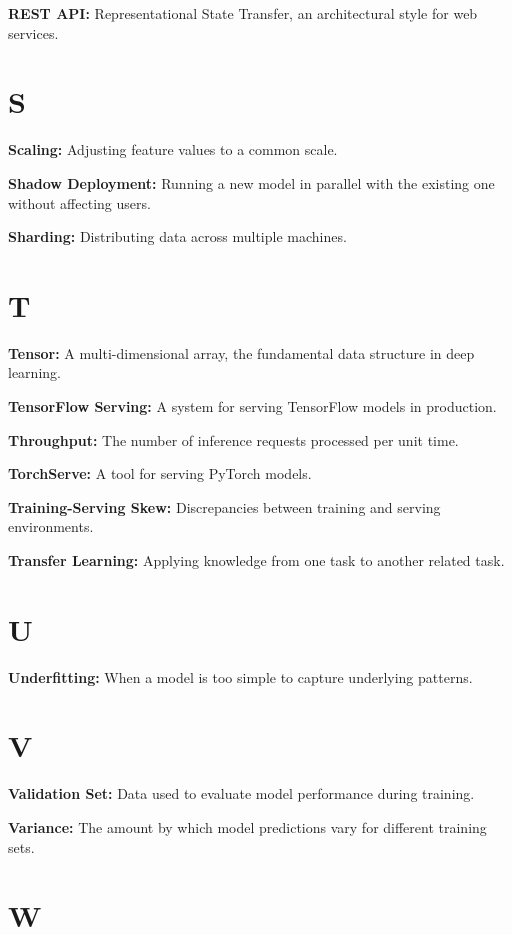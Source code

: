 \textbf{REST API:} Representational State Transfer, an architectural style for web services.

\section*{S}

\textbf{Scaling:} Adjusting feature values to a common scale.

\textbf{Shadow Deployment:} Running a new model in parallel with the existing one without affecting users.

\textbf{Sharding:} Distributing data across multiple machines.

\section*{T}

\textbf{Tensor:} A multi-dimensional array, the fundamental data structure in deep learning.

\textbf{TensorFlow Serving:} A system for serving TensorFlow models in production.

\textbf{Throughput:} The number of inference requests processed per unit time.

\textbf{TorchServe:} A tool for serving PyTorch models.

\textbf{Training-Serving Skew:} Discrepancies between training and serving environments.

\textbf{Transfer Learning:} Applying knowledge from one task to another related task.

\section*{U}

\textbf{Underfitting:} When a model is too simple to capture underlying patterns.

\section*{V}

\textbf{Validation Set:} Data used to evaluate model performance during training.

\textbf{Variance:} The amount by which model predictions vary for different training sets.

\section*{W}

